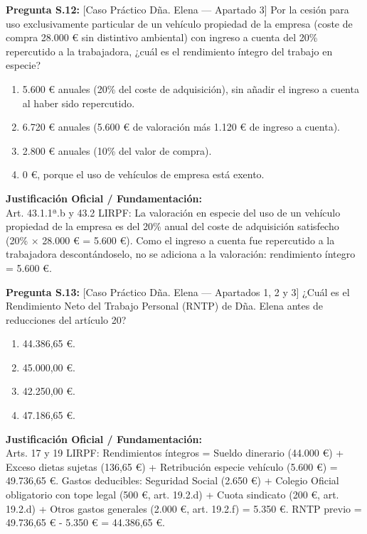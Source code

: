 \documentclass[11pt,a4paper,openany]{article}
\begin{document}
\noindent\textbf{\sffamily Pregunta S.12:} [Caso Práctico Dña. Elena — Apartado 3] Por la cesión para uso exclusivamente particular de un vehículo propiedad de la empresa (coste de compra 28.000 \euro{} sin distintivo ambiental) con ingreso a cuenta del 20\% repercutido a la trabajadora, ¿cuál es el rendimiento íntegro del trabajo en especie?\\[0.15cm]
\begin{enumerate}[label=\textbf{\alph*)},leftmargin=1.8em,itemsep=1.5pt,topsep=2pt,partopsep=0pt,parsep=0pt]
    \item 5.600 \euro{} anuales (20\% del coste de adquisición), sin añadir el ingreso a cuenta al haber sido repercutido.
    \item 6.720 \euro{} anuales (5.600 \euro{} de valoración más 1.120 \euro{} de ingreso a cuenta).
    \item 2.800 \euro{} anuales (10\% del valor de compra).
    \item 0 \euro{}, porque el uso de vehículos de empresa está exento.
\end{enumerate}
\begin{solucionBox}
\textbf{Justificación Oficial / Fundamentación:}\\[0.1cm]
Art. 43.1.1ª.b y 43.2 LIRPF: La valoración en especie del uso de un vehículo propiedad de la empresa es del 20\% anual del coste de adquisición satisfecho (20\% $\times$  28.000 \euro{} = 5.600 \euro{}). Como el ingreso a cuenta fue repercutido a la trabajadora descontándoselo, no se adiciona a la valoración: rendimiento íntegro = 5.600 \euro{}.
\end{solucionBox}
\vspace{0.35cm}

\noindent\textbf{\sffamily Pregunta S.13:} [Caso Práctico Dña. Elena — Apartados 1, 2 y 3] ¿Cuál es el Rendimiento Neto del Trabajo Personal (RNTP) de Dña. Elena antes de reducciones del artículo 20?\\[0.15cm]
\begin{enumerate}[label=\textbf{\alph*)},leftmargin=1.8em,itemsep=1.5pt,topsep=2pt,partopsep=0pt,parsep=0pt]
    \item 44.386,65 \euro{}.
    \item 45.000,00 \euro{}.
    \item 42.250,00 \euro{}.
    \item 47.186,65 \euro{}.
\end{enumerate}
\begin{solucionBox}
\textbf{Justificación Oficial / Fundamentación:}\\[0.1cm]
Arts. 17 y 19 LIRPF: Rendimientos íntegros = Sueldo dinerario (44.000 \euro{}) + Exceso dietas sujetas (136,65 \euro{}) + Retribución especie vehículo (5.600 \euro{}) = 49.736,65 \euro{}. Gastos deducibles: Seguridad Social (2.650 \euro{}) + Colegio Oficial obligatorio con tope legal (500 \euro{}, art. 19.2.d) + Cuota sindicato (200 \euro{}, art. 19.2.d) + Otros gastos generales (2.000 \euro{}, art. 19.2.f) = 5.350 \euro{}. RNTP previo = 49.736,65 \euro{} - 5.350 \euro{} = 44.386,65 \euro{}.
\end{solucionBox}
\vspace{0.35cm}
\end{document}
